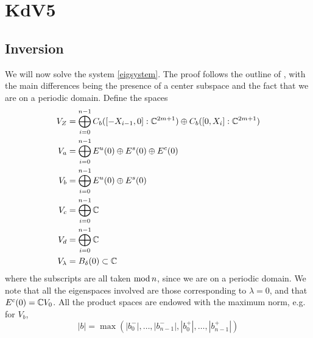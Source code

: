 \documentclass[thesis.tex]{subfiles}
\begin{document}
\iffulldocument\else
	\chapter{KdV5}
\fi

\section{Inversion}

We will now solve the system \cref{eigsystem}. The proof follows the outline of \cite[Theorem 2]{Sandstede1998}, with the main differences being the presence of a center subspace and the fact that we are on a periodic domain. Define the spaces
\begin{align*}
V_Z &= \bigoplus_{i=0}^{n-1} C_b([-X_{i-1},0]:\mathbb{C}^{2m+1}) \oplus C_b([0,X_i]:\mathbb{C}^{2m+1})  \\
V_a &= \bigoplus_{i=0}^{n-1} E^u(0) \oplus E^s(0) \oplus E^c(0) \\
V_b &= \bigoplus_{i=0}^{n-1} E^u(0) \oplus E^s(0) \\
V_c &= \bigoplus_{i=0}^{n-1} \mathbb{C} \\
V_d &= \bigoplus_{i=0}^{n-1} \mathbb{C} \\
V_\lambda &= B_\delta(0) \subset \mathbb{C}
\end{align*}
where the subscripts are all taken $\mathop\mathrm{mod}\nolimits n$, since we are on a periodic domain. We note that all the eigenspaces involved are those corresponding to $\lambda = 0$, and that $E^c(0) = \mathbb{C} V_0$. All the product spaces are endowed with the maximum norm, e.g. for $V_b$, 
\[
|b| = \max(|b_0^-|, \dots, |b_{n-1}^-|, |b_0^+|, \dots, |b_{n-1}^+|)
\]
\end{document}
